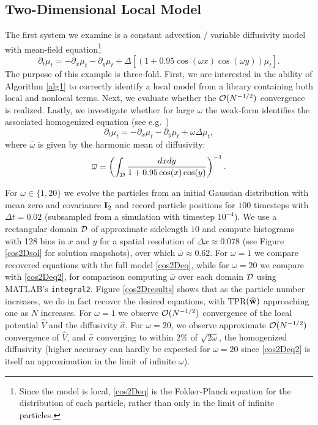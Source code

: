 \documentclass[english,reqno]{amsart}
\begin{document}
\subsection{Two-Dimensional Local Model}\label{sec:cos2D}

The first system we examine is a constant advection / variable diffusivity model with mean-field equation\footnote{Since the model is local, \eqref{cos2Deq} is the Fokker-Planck equation for the distribution of each particle, rather than only in the limit of infinite particles.}
\begin{equation}\label{cos2Deq}
\partial_t\mu_t =-\partial_x\mu_t-\partial_y\mu_t + \Delta \left[\left(1+0.95\cos(\omega x)\cos(\omega y)\right)\mu_t\right].
\end{equation}
The purpose of this example is three-fold. First, we are interested in the ability of Algorithm \ref{alg1} to correctly identify a local model from a library containing both local and nonlocal terms. Next, we evaluate whether the ${\mathcal{O}}(N^{-1/2})$ convergence is realized. Lastly, we investigate whether for large $\omega$ the weak-form identifies the associated homogenized equation  (see e.g.\ \cite{weinan2011principles}) 
\begin{equation}\label{cos2Deq2}
\partial_t\mu_t =-\partial_x\mu_t-\partial_y\mu_t + \overline{\omega}\Delta \mu_t,
\end{equation}
where $\overline{\omega}$ is given by the harmonic mean of diffusivity:
\[\overline{\omega} = \left(\int_{\mathcal{D}} \frac{dxdy}{1+0.95\cos(x)\cos(y)}\right)^{-1}.\]

For $\omega\in\{1,20\}$ we evolve the particles from an initial Gaussian distribution with mean zero and covariance $\mathbf{I}_2$ and record particle positions for $100$ timesteps with $\Delta t=0.02$ (subsampled from a simulation with timestep $10^{-4}$). We use a rectangular domain ${\mathcal{D}}$ of approximate sidelength $10$ and compute histograms with 128 bins in $x$ and $y$ for a spatial resolution of $\Delta x\approx 0.078$ (see Figure \ref{cos2Dsol} for solution snapshots), over which $\overline{\omega}\approx 0.62$. For $\omega=1$ we compare recovered equations with the full model \eqref{cos2Deq}, while for $\omega=20$ we compare with \eqref{cos2Deq2}, for comparison computing $\overline{\omega}$ over each domain ${\mathcal{D}}$ using MATLAB's \texttt{integral2}. Figure \ref{cos2Dresults} shows that as the particle number increases, we do in fact recover the desired equations, with TPR$({\widehat{\mathbf{w}}})$ approaching one as $N$ increases. For $\omega=1$ we observe ${\mathcal{O}}(N^{-1/2})$ convergence of the local potential $\widehat{V}$ and the diffusivity $\widehat{\sigma}$. For $\omega=20$, we observe approximate ${\mathcal{O}}(N^{-1/2})$ convergence of $\widehat{V}$, and $\widehat{\sigma}$ converging to within $2\%$ of $\sqrt{2\overline{\omega}}$, the homogenized diffusivity (higher accuracy can hardly be expected for $\omega=20$ since \eqref{cos2Deq2} is itself an approximation in the limit of infinite $\omega$). 
\end{document}
